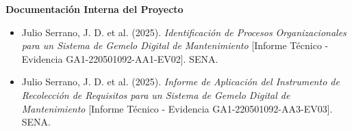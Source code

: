 \textbf{Documentación Interna del Proyecto}
\begin{itemize}
    \item Julio Serrano, J. D. et al. (2025). \textit{Identificación de Procesos Organizacionales para un Sistema de Gemelo Digital de Mantenimiento} [Informe Técnico - Evidencia GA1-220501092-AA1-EV02]. SENA.
    \item Julio Serrano, J. D. et al. (2025). \textit{Informe de Aplicación del Instrumento de Recolección de Requisitos para un Sistema de Gemelo Digital de Mantenimiento} [Informe Técnico - Evidencia GA1-220501092-AA3-EV03]. SENA.
\end{itemize}
